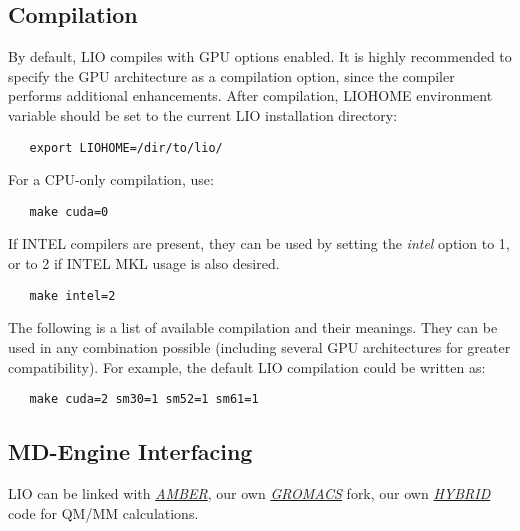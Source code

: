 \subsection{Compilation}

By default, LIO compiles with GPU options enabled. It is highly recommended to specify
the GPU architecture as a compilation option, since the compiler performs additional
enhancements. After compilation, LIOHOME environment variable should be set to the
current LIO installation directory:

\begin{lstlisting}
   export LIOHOME=/dir/to/lio/
\end{lstlisting}

For a CPU-only compilation, use:

\begin{lstlisting}
   make cuda=0
\end{lstlisting}

If INTEL compilers are present, they can be used by setting the \textit{intel}
option to 1, or to 2 if INTEL MKL usage is also desired. 

\begin{lstlisting}
   make intel=2
\end{lstlisting}

The following is a list of available compilation and their meanings. They can be
used in any combination possible (including several GPU architectures for greater
compatibility). For example, the default LIO compilation could be written as:

\begin{lstlisting}
   make cuda=2 sm30=1 sm52=1 sm61=1
\end{lstlisting}



\subsection{MD-Engine Interfacing}
LIO can be linked with  \textit{\href{http://ambermd.org/index.php}{AMBER}},
our own \textit{\href{https://github.com/MALBECC/gromacs}{GROMACS}} fork, 
our own \textit{\href{https://github.com/MALBECC/hybrid}{HYBRID}} code for 
QM/MM calculations.

